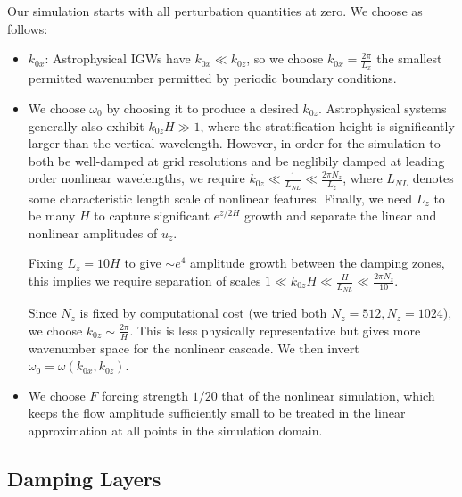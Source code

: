 \documentclass[twocolumn,
        nofootinbib, %
        usenames, %
        aps,
        prd,
        dvipsnames %
    ]{revtex4-1}%
\begin{document}
Our
simulation starts with all perturbation quantities at zero. We choose as
follows:
\begin{itemize}
    \item $k_{0x}$: Astrophysical IGWs have $k_{0x} \ll k_{0z}$, so we choose $k_{0x}
        = \frac{2\pi}{L_x}$ the smallest permitted wavenumber permitted by
        periodic boundary conditions.

    \item We choose $\omega_0$ by choosing it to produce a desired $k_{0z}$.
        Astrophysical systems generally also exhibit $k_{0z}H \gg 1$, where the
        stratification height is significantly larger than the vertical
        wavelength. However, in order for the simulation to both be well-damped
        at grid resolutions and be neglibily damped at leading order nonlinear
        wavelengths, we require $k_{0z} \ll \frac{1}{L_{NL}} \ll \frac{2\pi
        N_z}{L_z}$, where $L_{NL}$ denotes some characteristic length scale of
        nonlinear features. Finally, we need $L_z$ to be many $H$ to capture
        significant $e^{z/2H}$ growth and separate the linear and nonlinear
        amplitudes of $u_z$.

        Fixing $L_z = 10H$ to give $\sim e^4$ amplitude growth between the
        damping zones, this implies we require separation of scales $1 \ll
        k_{0z}H \ll \frac{H}{L_{NL}} \ll \frac{2\pi N_z}{10}$.

        Since $N_z$ is fixed by computational cost (we tried both $N_z = 512,
        N_z = 1024$), we choose $k_{0z} \sim \frac{2\pi}{H}$. This is less
        physically representative but gives more wavenumber space for the
        nonlinear cascade. We then invert $\omega_0 = \omega(k_{0x}, k_{0z})$.

    \item We choose $F$ forcing strength $1/20$ that of the nonlinear
        simulation, which keeps the flow amplitude sufficiently small to be
        treated in the linear approximation at all points in the simulation
        domain.
\end{itemize}

\subsection{Damping Layers}\label{ss:damping}
\end{document}
